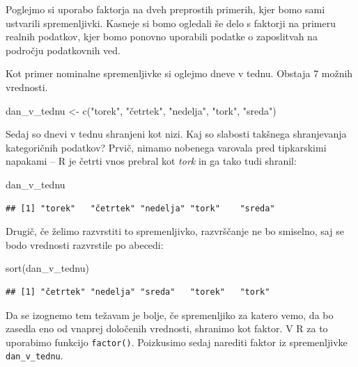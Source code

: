 \documentclass[
]{book}
\newenvironment{Shaded}{\begin{snugshade}}{\end{snugshade}}
\newcommand{\FunctionTok}[1]{\textcolor[rgb]{0.00,0.00,0.00}{#1}}
\newcommand{\NormalTok}[1]{#1}
\newcommand{\OtherTok}[1]{\textcolor[rgb]{0.56,0.35,0.01}{#1}}
\newcommand{\StringTok}[1]{\textcolor[rgb]{0.31,0.60,0.02}{#1}}
\begin{document}
Poglejmo si uporabo faktorja na dveh preprostih primerih, kjer bomo sami ustvarili spremenljivki. Kasneje si bomo ogledali še delo s faktorji na primeru realnih podatkov, kjer bomo ponovno uporabili podatke o zaposlitvah na področju podatkovnih ved.

Kot primer nominalne spremenljivke si oglejmo dneve v tednu. Obstaja 7 možnih vrednosti.

\begin{Shaded}
\begin{Highlighting}[]
\NormalTok{dan\_v\_tednu }\OtherTok{\textless{}{-}} \FunctionTok{c}\NormalTok{(}\StringTok{"torek"}\NormalTok{, }\StringTok{"četrtek"}\NormalTok{, }\StringTok{"nedelja"}\NormalTok{, }\StringTok{"tork"}\NormalTok{, }\StringTok{"sreda"}\NormalTok{)}
\end{Highlighting}
\end{Shaded}

Sedaj so dnevi v tednu shranjeni kot nizi. Kaj so slabosti takšnega shranjevanja kategoričnih podatkov? Prvič, nimamo nobenega varovala pred tipkarskimi napakami -- R je četrti vnos prebral kot \emph{tork} in ga tako tudi shranil:

\begin{Shaded}
\begin{Highlighting}[]
\NormalTok{dan\_v\_tednu}
\end{Highlighting}
\end{Shaded}

\begin{verbatim}
## [1] "torek"   "četrtek" "nedelja" "tork"    "sreda"
\end{verbatim}

Drugič, če želimo razvrstiti to spremenljivko, razvrščanje ne bo smiselno, saj se bodo vrednosti razvrstile po abecedi:

\begin{Shaded}
\begin{Highlighting}[]
\FunctionTok{sort}\NormalTok{(dan\_v\_tednu)}
\end{Highlighting}
\end{Shaded}

\begin{verbatim}
## [1] "četrtek" "nedelja" "sreda"   "torek"   "tork"
\end{verbatim}

Da se izognemo tem težavam je bolje, če spremenljiko za katero vemo, da bo zasedla eno od vnaprej določenih vrednosti, shranimo kot faktor. V R za to uporabimo funkcijo \texttt{factor()}. Poizkusimo sedaj narediti faktor iz spremenljivke \texttt{dan\_v\_tednu}.
\end{document}
